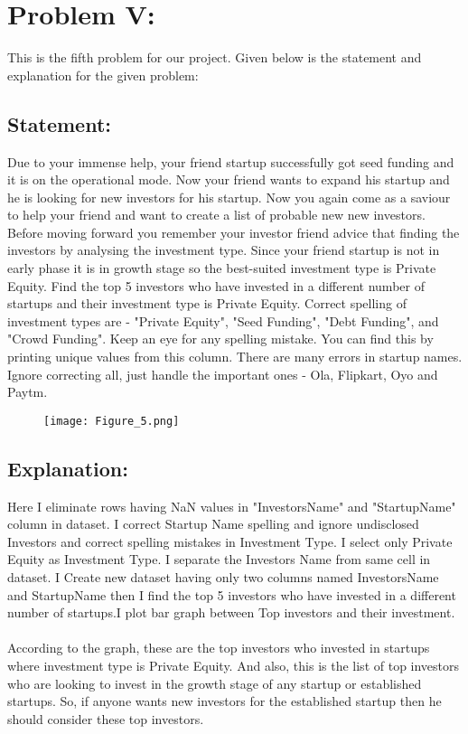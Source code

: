 \documentclass[12pt,a4paper]{article}
\begin{document}
\section{Problem V:}
This is the fifth problem for our project. Given below is the statement and explanation for the given problem:
\subsection{Statement:}
Due to your immense help, your friend startup successfully got seed funding and it is on the operational mode. Now your friend wants to expand his startup and he is looking for new investors for his startup. Now you again come as a saviour to help your friend and want to create a list of probable new new investors. Before moving forward you remember your investor friend advice that finding the investors by analysing the investment type. Since your friend startup is not in early phase it is in growth stage so the best-suited investment type is Private Equity. Find the top 5 investors who have invested in a different number of startups and their investment type is Private Equity. Correct spelling of investment types are - "Private Equity", "Seed Funding", "Debt Funding", and "Crowd Funding". Keep an eye for any spelling mistake. You can find this by printing unique values from this column. There are many errors in startup names. Ignore correcting all, just handle the important ones - Ola, Flipkart, Oyo and Paytm.
\begin{figure}[!ht]
	\begin{center}
			\texttt{[image: Figure\_5.png]}
	\end{center}
\end{figure}
\clearpage
\subsection{Explanation:}
Here I eliminate rows having NaN values in "InvestorsName" and "StartupName" column in dataset. I correct Startup Name spelling and ignore undisclosed Investors and correct spelling mistakes in Investment Type. I select only Private Equity as Investment Type. I separate the Investors Name from same cell in dataset. I Create new dataset having only two columns named InvestorsName and StartupName then I find the top 5 investors who
have invested in a different number of startups.I plot bar graph between Top investors and their investment.\\
\\According to the graph, these are the top investors who invested in startups where investment type is Private Equity. And also, this is the list of top investors who are looking to invest in the growth stage of any startup or
established startups. So, if anyone wants new investors for the established startup then he should consider these top investors.
\end{document}
